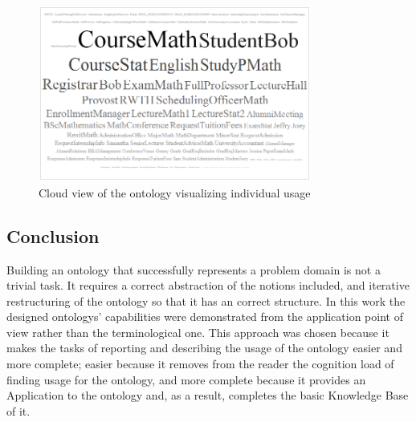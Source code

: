 \documentclass{article}    %
\begin{document}
\begin{figure}[htbp]
  \centering
    \includegraphics[width=0.8\textwidth]{Materials/Figures/cloudIndies.png}
    \caption{Cloud view of the ontology visualizing individual usage}
  \label{cloudIndi}
\end{figure}

% 
\subsection{Conclusion}
%
Building an ontology that successfully represents a problem domain is not a trivial task. It requires a correct abstraction of the notions included, and iterative restructuring of the ontology so that it has an correct structure. In this work the designed ontologys' capabilities were demonstrated from the application point of view rather than the terminological one. This approach was chosen because it makes the tasks of reporting and describing the usage of the ontology easier and more complete; easier because it removes from the reader the cognition load of finding usage for the ontology, and more complete because it provides an Application to the ontology and, as a result, completes the basic Knowledge Base of it.
\end{document}
